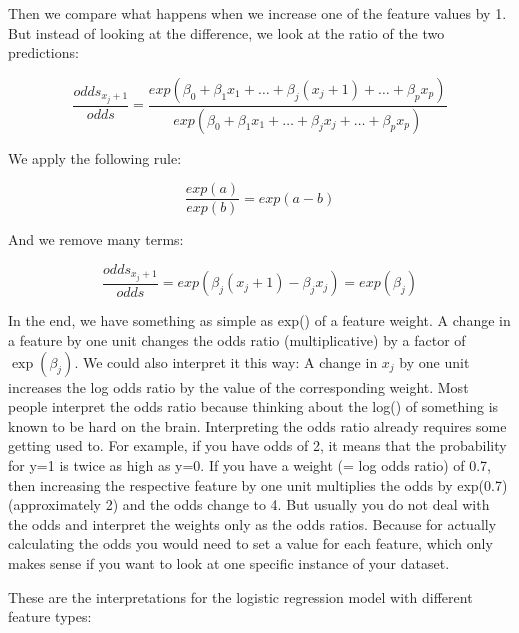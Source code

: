 \documentclass[
  12pt,
]{krantz}
\begin{document}
Then we compare what happens when we increase one of the feature values by 1.
But instead of looking at the difference, we look at the ratio of the two predictions:

\[\frac{odds_{x_j+1}}{odds}=\frac{exp\left(\beta_{0}+\beta_{1}x_{1}+\ldots+\beta_{j}(x_{j}+1)+\ldots+\beta_{p}x_{p}\right)}{exp\left(\beta_{0}+\beta_{1}x_{1}+\ldots+\beta_{j}x_{j}+\ldots+\beta_{p}x_{p}\right)}\]

We apply the following rule:

\[\frac{exp(a)}{exp(b)}=exp(a-b)\]

And we remove many terms:

\[\frac{odds_{x_j+1}}{odds}=exp\left(\beta_{j}(x_{j}+1)-\beta_{j}x_{j}\right)=exp\left(\beta_j\right)\]

In the end, we have something as simple as exp() of a feature weight.
A change in a feature by one unit changes the odds ratio (multiplicative) by a factor of \(\exp(\beta_j)\).
We could also interpret it this way:
A change in \(x_j\) by one unit increases the log odds ratio by the value of the corresponding weight.
Most people interpret the odds ratio because thinking about the log() of something is known to be hard on the brain.
Interpreting the odds ratio already requires some getting used to.
For example, if you have odds of 2, it means that the probability for y=1 is twice as high as y=0.
If you have a weight (= log odds ratio) of 0.7, then increasing the respective feature by one unit multiplies the odds by exp(0.7) (approximately 2) and the odds change to 4.
But usually you do not deal with the odds and interpret the weights only as the odds ratios.
Because for actually calculating the odds you would need to set a value for each feature, which only makes sense if you want to look at one specific instance of your dataset.

These are the interpretations for the logistic regression model with different feature types:
\end{document}

